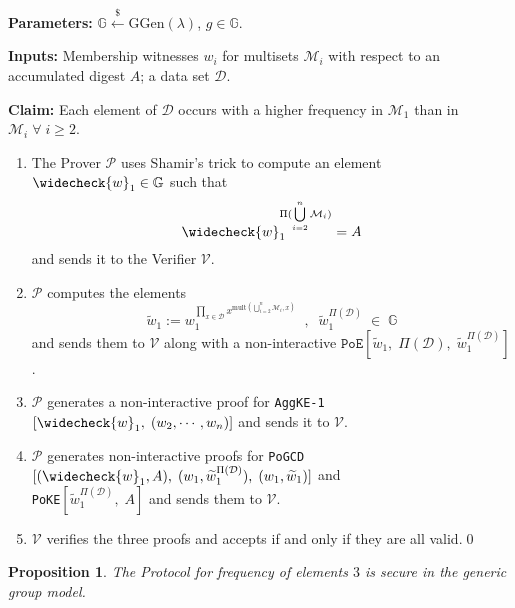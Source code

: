\documentclass[11pt, lettersize, notitlepage, leqno, footskip=0.6cm]{article}
\newcommand{\pl}{\prod\limits}
\newcommand{\ttt}{\texttt}
\newcommand{\wti}{\widetilde}
\newcommand{\mc}{\mathcal}
\newcommand{\mb}{\mathbb}
\newcommand{\mr}{\mathrm}
\newcommand{\lamb}{\lambda}
\newcommand{\weck}{\widecheck}
\newcommand{\mP}{\mc{P}}
\newcommand{\V}{\mc{V}}
\newcommand{\vs}{\vspace{-0.15cm}}
\newcommand{\noin}{\noindent}
\newtheorem{Prop}[Thm]{Proposition}
\numberwithin{equation}{section}
\begin{document}
\noin \textbf{Parameters:} $\mb{G}\xleftarrow{\$} \mr{GGen}(\lamb)$,\; $g\in \mb{G}$.

\noin \textbf{Inputs:} Membership witnesses $w_i$ for multisets $\mc{M}_i$ with respect to an accumulated digest $A$; a data set $\mc{D}$.

\noin \textbf{Claim:} Each element of $\mc{D}$ occurs with a higher frequency in $\mc{M}_1$ than in $\mc{M}_i\;\forall\;i\geq 2$. \vs

\begin{enumerate}[wide, labelwidth=!, labelindent=0pt] \vs

\item The Prover $\mP$ uses Shamir's trick to compute an element $\weck{w}_1\in \mb{G}$ such that \vs $$\weck{w}_1 ^{\Pi(\bigcup\limits_{i=2}^n \mc{M}_i)} = A $$ and sends it to the Verifier $\V$. \vs

\item $\mP$ computes the elements \vs $$\wti{w}_1:= w_1^{\pl_{x\in\mc{D}} x^{\mr{mult}(\bigcup\limits_{i=2}^n \mc{M}_i, x)}}\;\;,\;\; \wti{w}_1^{\Pi(\mc{D})}\;\in\;\mb{G}$$ and sends them to $\V$ along with a non-interactive $\ttt{PoE}[\wti{w}_1,\;\Pi(\mc{D}),\;\wti{w}_1^{\Pi(\mc{D})}]$. \vs

\item $\mP$ generates a non-interactive proof for \verb|AggKE-1|$[\weck{w}_1,\;(w_2,\cdots,w_n)]$ and sends it to $\V$. \vs

\item $\mP$ generates non-interactive proofs for \verb|PoGCD|$[(\weck{w}_1, A),\;(w_1,\wti{w}_1^{\Pi(\mc{D})}),\;(w_1,\wti{w}_1)]$ and\\ \verb|PoKE|$[\wti{w}_1^{\Pi(\mc{D})},\;A]$ and sends them to $\V$. \vs

\item $\V$ verifies the three proofs and accepts if and only if they are all valid.\qed\end{enumerate}


\begin{Prop} The Protocol for frequency of elements $3$ is secure in the generic group model. \end{Prop}
\end{document}
